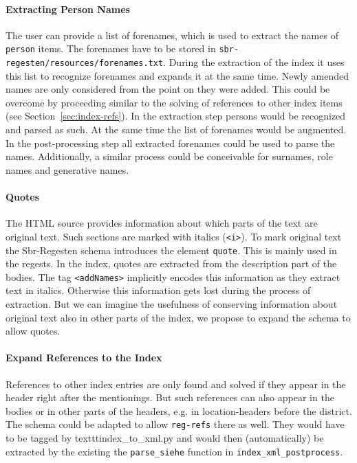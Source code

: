 \paragraph{Extracting Person Names}
The user can provide a list of forenames, which is used to extract the names of \texttt{person} items. The forenames have to be stored in \texttt{sbr-regesten/resources/forenames.txt}. During the extraction of the index it uses this list to recognize forenames and expands it at the same time. Newly amended names are only considered from the point on they were added. This could be overcome by proceeding similar to the solving of references to other index items (see Section~\ref{sec:index-refs}). In the extraction step persons would be recognized and parsed as such. At the same time the list of forenames would be augmented. In the post-processing step all extracted forenames could be used to parse the names. Additionally, a similar process could be conceivable for surnames, role names and generative names.

\paragraph{Quotes}
The HTML source provides information about which parts of the text are original text. Such sections are marked with italics (\texttt{<i>}). To mark original text the Sbr-Regesten schema introduces the element \texttt{quote}. This is mainly used in the regests. In the index, quotes are extracted from the description part of the bodies. The tag \texttt{<addNames>} implicitly encodes this information as they extract text in italics. Otherwise this information gets lost during the process of extraction. But we can imagine the usefulness of conserving information about original text also in other parts of the index, we propose to expand the schema to allow quotes.

\paragraph{Expand References to the Index}
References to other index entries are only found and solved if they appear in the header right after the mentionings. But such references can also appear in the bodies or in other parts of the headers, e.g. in location-headers before the district. The schema could be adapted to allow \texttt{reg-refs} there as well. They would have to be tagged by texttt{index\_to\_xml.py} and would then (automatically) be extracted by the existing the \texttt{parse\_siehe} function in \texttt{index\_xml\_postprocess}.


